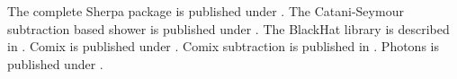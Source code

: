 \documentclass{article}
\begin{document}
The complete Sherpa package is published under \cite{Gleisberg:2008ta}.
The Catani-Seymour subtraction based shower is published under \cite{Schumann:2007mg}.
The BlackHat library is described in \cite{Berger:2008sj}.
Comix is published under \cite{Gleisberg:2008fv}.
Comix subtraction is published in \cite{Hoeche:2012xx}.
Photons is published under \cite{Schonherr:2008av}.
\end{document}
